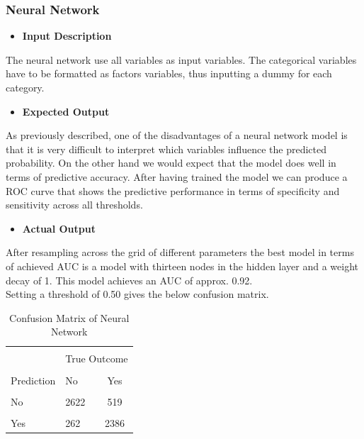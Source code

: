   	\subsubsection{Neural Network}
  	\begin{itemize}
  		\item \textbf{Input Description}
  	\end{itemize}
  	\noindent The neural network use all variables as input variables. The categorical variables have to be formatted as factors variables, thus inputting a dummy for each category. 
  	\begin{itemize}
  		\item \textbf{Expected Output}
  	\end{itemize}
  	As previously described, one of the disadvantages of a neural network model is that it is very difficult to interpret which variables influence the predicted probability. On the other hand we would expect that the model does well in terms of predictive accuracy. After having trained the model we can produce a ROC curve that shows the predictive performance in terms of specificity and sensitivity across all thresholds.\\   
  	\begin{itemize}
  		\item \textbf{Actual Output}
  	\end{itemize}
  	\noindent After resampling across the grid of different parameters the best model in terms of achieved AUC is a model with thirteen nodes in the hidden layer and a weight decay of 1. This model achieves an AUC of approx. 0.92.\\
  	Setting a threshold of 0.50 gives the below confusion matrix.

\begin{center}
\begin{table}[!htbp]
	\centering  
	\begin{tabular}{llc}
		\hline
		\hline\\[-1.8ex]
		& \multicolumn{2}{c}{True Outcome} \\
		\cline{2-3}\\[-1.8ex]
		Prediction & No & Yes \\
		\hline \\[-1.8ex] 
		No & 2622 & 519 \\ 
		\hline \\[-1.8ex] 
		Yes& 262 & 2386\\ 
		\hline
		\hline
	\end{tabular}  
	\caption{Confusion Matrix of Neural Network} 
\end{table}
\end{center}
 \newpage
 \pagestyle{fancy}
